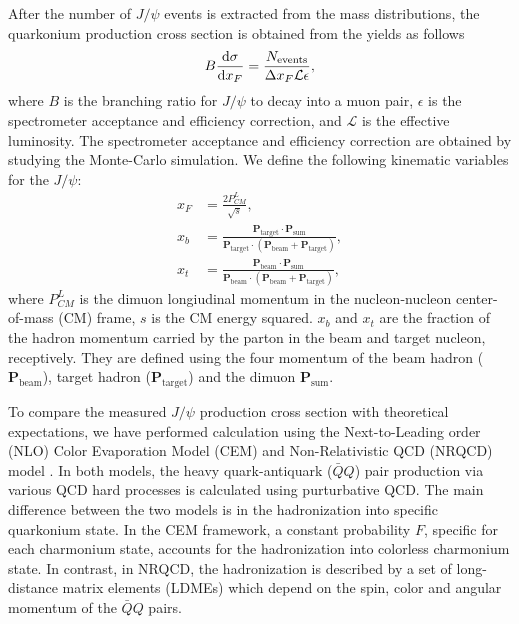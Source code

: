 \documentclass[10pt,a4paper,final]{article}
\begin{document}
After the number of $J/\psi$ events is extracted from the mass distributions,
the quarkonium production cross section is obtained from the yields as follows
\begin{equation}
	B\dv{\sigma}{x_F} = \frac{N_{\textrm{events}}}{\Delta x_F \mathcal{L} \epsilon},
\end{equation}
where $B$ is the branching ratio for $J/\psi$ to decay into a muon pair,
$\epsilon$ is the spectrometer acceptance and efficiency correction, and
$\mathcal{L}$ is the effective luminosity. The spectrometer acceptance and
efficiency correction are obtained by studying the Monte-Carlo simulation.
We define the following kinematic variables for the $J/\psi$:
\begin{align}
x_F &= \frac{2P^L_{CM}}{\sqrt{s}},\\
x_b &= \frac{\textbf{P}_{\textrm{target}}\cdot\textbf{P}_{\textrm{sum}}}{\textbf{P}_{\textrm{target}} \cdot\left(\textbf{P}_{\textrm{beam}}+\textbf{P}_{\textrm{target}}\right)},\\
x_t &= \frac{\textbf{P}_{\textrm{beam}}\cdot\textbf{P}_{\textrm{sum}}}{\textbf{P}_{\textrm{beam}} \cdot\left(\textbf{P}_{\textrm{beam}}+\textbf{P}_{\textrm{target}}\right)},
\end{align}
where $P^L_{CM}$ is the dimuon longiudinal momentum in the nucleon-nucleon
center-of-mass (CM) frame, $s$ is the CM energy squared. $x_b$ and $x_t$ are
the fraction of the hadron momentum carried by the parton in the beam and
target nucleon, receptively. They are defined using the four momentum of
the beam hadron ($\textbf{P}_{\textrm{beam}}$), target hadron ($\textbf{P}_{\textrm{target}}$)
and the dimuon $\textbf{P}_{\textrm{sum}}$.

To compare the measured $J/\psi$ production cross section with theoretical
expectations, we have performed calculation using the Next-to-Leading
order (NLO) Color Evaporation Model (CEM)\cite{mangano1993} and
Non-Relativistic QCD (NRQCD) model \cite{bodwin1997}. In both models, the heavy
quark-antiquark ($\bar{Q}Q$) pair production via various QCD hard processes
is calculated using purturbative QCD. The main difference between the two
models is in the hadronization into specific quarkonium state.
In the CEM framework, a constant probability $F$, specific for each charmonium
state, accounts for the hadronization into colorless charmonium state. In contrast,
in NRQCD, the hadronization is described by a set of long-distance matrix elements
(LDMEs) which depend on the spin, color and angular momentum of the $\bar{Q}Q$ pairs.
\end{document}
